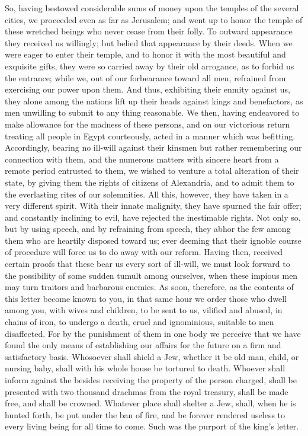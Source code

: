 {So, having bestowed considerable sums of money upon the temples of the several cities, we proceeded even as far as Jerusalem; and went up to honor the temple of these wretched beings who never cease from their folly.
To outward appearance they received us willingly; but belied that appearance by their deeds. When we were eager to enter their temple, and to honor it with the most beautiful and exquisite gifts,
they were so carried away by their old arrogance, as to forbid us the entrance; while we, out of our forbearance toward all men, refrained from exercising our power upon them.
And thus, exhibiting their enmity against us, they alone among the nations lift up their heads against kings and benefactors, as men unwilling to submit to any thing reasonable.
We then, having endeavored to make allowance for the madness of these persons, and on our victorious return treating all people in Egypt courteously, acted in a manner which was befitting.
Accordingly, bearing no ill-will against their kinsmen
{} but rather remembering our connection with them, and the numerous matters with sincere heart from a remote period entrusted to them, we wished to venture a total alteration of their state, by giving them the rights of citizens of Alexandria, and to admit them to the everlasting rites of our solemnities.
All this, however, they have taken in a very different spirit. With their innate malignity, they have spurned the fair offer; and constantly inclining to evil,
have rejected the inestimable rights. Not only so, but by using speech, and by refraining from speech, they abhor the few among them who are heartily disposed toward us; ever deeming that their ignoble course of procedure will force us to do away with our reform.
Having then, received certain proofs that these
{} bear us every sort of ill-will, we must look forward to the possibility of some sudden tumult among ourselves, when these impious men may turn traitors and barbarous enemies.
As soon, therefore, as the contents of this letter become known to you, in that same hour we order those
{} who dwell among you, with wives and children, to be sent to us, vilified and abused, in chains of iron, to undergo a death, cruel and ignominious, suitable to men disaffected.
For by the punishment of them in one body we perceive that we have found the only means of establishing our affairs for the future on a firm and satisfactory basis.
Whosoever shall shield a Jew, whether it be old man, child, or nursing baby, shall with his whole house be tortured to death.
Whoever shall inform against the
{} besides receiving the property of the person charged, shall be presented with two thousand drachmas from the royal treasury, shall be made free, and shall be crowned.
Whatever place shall shelter a Jew, shall, when he is hunted forth, be put under the ban of fire, and be forever rendered useless to every living being for all time to come.
Such was the purport of the king’s letter.

}

